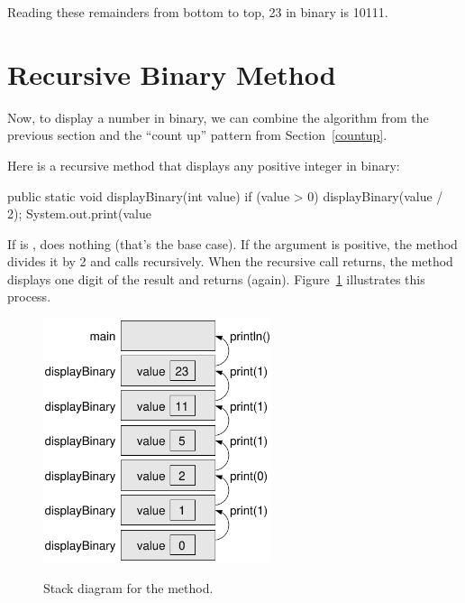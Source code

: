 Reading these remainders from bottom to top, 23 in binary is 10111.


\section{Recursive Binary Method}

Now, to display a number in binary, we can combine the algorithm from the previous section and the ``count up'' pattern from Section~\ref{countup}.

Here is a recursive method that displays any positive integer in binary:

\begin{code}
public static void displayBinary(int value) {
    if (value > 0) {
        displayBinary(value / 2);
        System.out.print(value %
    }
}
\end{code}

If  is ,  does nothing (that's the base case).
If the argument is positive, the method divides it by 2 and calls  recursively.
When the recursive call returns, the method displays one digit of the result and returns (again).
Figure~\ref{fig.stack4} illustrates this process.


\begin{figure}[!ht]
\begin{center}
\includegraphics[width=190pt,alt={Stack diagram showing the call stack for displayBinary method, illustrating how binary digits are processed and displayed in reverse order}]{figs/stack4.pdf}
\caption{Stack diagram for the  method.}
\label{fig.stack4}
\end{center}
\end{figure}

